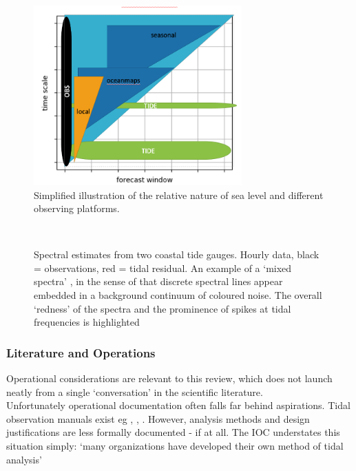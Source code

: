 \begin{figure}[!h]
\begin{center}
\includegraphics[width=80mm]{figures/images/sealevel_cartoon.png}
\caption{Simplified illustration of the relative nature of sea level and different observing platforms.}
\label{fig:SEALEVEL}
\end{center}
\end{figure}


\begin{figure}[!h]
	\centering
	 \\
	\caption{Spectral estimates from two coastal tide gauges. Hourly data, black = observations, red = tidal residual. An example of a `mixed spectra' \citep{Percival:1998tw}, in the sense of that discrete spectral lines appear embedded in a background continuum of coloured noise.  The overall `redness' of the spectra and the prominence of spikes at tidal frequencies is highlighted }
    \label{fig:SPECTRA_EG}
\end{figure}


\subsubsection{Literature and Operations}
\label{S:operational_setting}

Operational considerations are relevant to this review, which does not launch neatly from a single `conversation' \citep{Booth:2009vy} in the scientific literature.\\
Unfortunately operational documentation often falls far behind aspirations.
Tidal observation manuals exist eg \citep{IOC:2005tj}, \citep{Level:2011wu}, \citep{Parker:2007wq}.  However, analysis methods and design justifications are less formally documented - if at all.  The IOC understates this situation simply: `many organizations have developed their own method of tidal analysis'\citep{IOC:2005tj}\\

